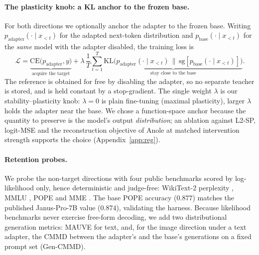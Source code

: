\documentclass{article}
\begin{document}
\paragraph{The plasticity knob: a KL anchor to the frozen base.}
For both directions we optionally anchor the adapter to the frozen base. Writing
$p_{\text{adapter}}(\cdot\mid x_{<t})$ for the adapted next-token distribution
and $p_{\text{base}}(\cdot\mid x_{<t})$ for the \emph{same} model with the
adapter disabled, the training loss is
\begin{equation}
\mathcal{L}=\underbrace{\mathrm{CE}\big(p_{\text{adapter}},y\big)}_{\text{acquire the target}}
+\lambda\,\frac{1}{T}\sum_{t=1}^{T}\underbrace{\mathrm{KL}\!\big(p_{\text{adapter}}(\cdot\mid x_{<t})\,\big\|\,\mathrm{sg}[p_{\text{base}}(\cdot\mid x_{<t})]\big)}_{\text{stay close to the base}} .
\label{eq:kl}
\end{equation}
The reference is obtained for free by disabling the adapter, so no separate
teacher is stored, and is held constant by a stop-gradient. The single weight
$\lambda$ is our stability--plasticity knob: $\lambda=0$ is plain fine-tuning
(maximal plasticity), larger $\lambda$ holds the adapter near the base. We chose
a function-space anchor because the quantity to preserve is the model's output
\emph{distribution}; an ablation against L2-SP, logit-MSE and the reconstruction
objective of Anole \citep{chern2024anole} at matched intervention strength
supports the choice (Appendix~\ref{app:reg}).

\paragraph{Retention probes.}
We probe the non-target directions with four public benchmarks scored by
log-likelihood only, hence deterministic and judge-free: WikiText-2 perplexity
\citep{wikitext}, MMLU \citep{mmlu}, POPE \citep{pope} and MME \citep{mme}. The
base POPE accuracy ($0.877$) matches the published Janus-Pro-7B value
($0.874$), validating the harness. Because likelihood benchmarks never exercise
free-form decoding, we add two distributional generation metrics: MAUVE
\citep{pillutla2021mauve} for text, and, for the image direction under a text
adapter, the CMMD \citep{cmmd} between the adapter's and the base's generations
on a fixed prompt set (Gen-CMMD).
\end{document}
